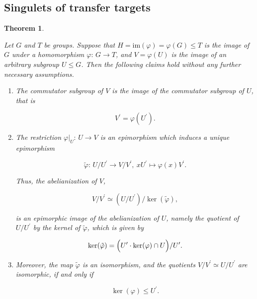\documentclass{amsart}
\newtheorem{theorem}{Theorem}[section]
\theoremstyle{definition}
\numberwithin{equation}{section}
\begin{document}
\subsection{Singulets of transfer targets}
\label{ss:TargetSing}

\begin{theorem}
\label{thm:TargetSing}

Let \(G\) and \(T\) be groups.
Suppose that
\(H=\mathrm{im}(\varphi)=\varphi(G)\le T\)
is the image of \(G\) under a homomorphism \(\varphi:\,G\to T\),
and \(V=\varphi(U)\) is the image of an arbitrary subgroup \(U\le G\).
Then the following claims hold
without any further necessary assumptions.

\begin{enumerate}

\item
The commutator subgroup of \(V\) is the image of the commutator subgroup of \(U\),
that is

\begin{equation}
\label{eqn:ImgDrvSbg}
V^\prime=\varphi(U^\prime).
\end{equation}

\item
The restriction \(\varphi\vert_U:\,U\to V\) is an epimorphism which
induces a unique epimorphism

\begin{equation}
\label{eqn:IndEpi}
\tilde{\varphi}:\,U/U^\prime\to V/V^\prime,\ xU^\prime\mapsto\varphi(x)V^\prime.
\end{equation}

\noindent
Thus, the abelianization of \(V\),

\begin{equation}
\label{eqn:ImgIndEpi}
V/V^\prime\simeq (U/U^\prime)/\ker(\tilde{\varphi}),
\end{equation}

\noindent
is an epimorphic image of the abelianization of \(U\),
namely the quotient of \(U/U^\prime\) by the kernel of \(\tilde{\varphi}\),
which is given by

\begin{equation}
\label{eqn:KerIndEpi}
\ker(\tilde{\varphi})=\Bigl(U^\prime\cdot\ker(\varphi)\cap U\Bigr)/U^\prime.
\end{equation}

\item
Moreover,
the map \(\tilde{\varphi}\) is an isomorphism,
and the quotients \(V/V^\prime\simeq U/U^\prime\) are isomorphic,
if and only if

\begin{equation}
\label{eqn:IndIso}
\ker(\varphi)\le U^\prime.
\end{equation}

\end{enumerate}

\end{theorem}
\end{document}

